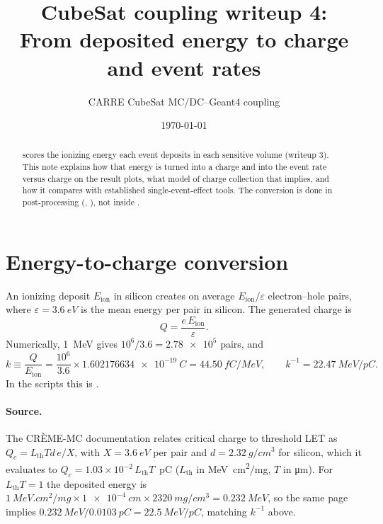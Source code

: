 

\title{CubeSat coupling writeup 4:\\From deposited energy to charge and event rates}
\author{CARRE CubeSat MC/DC--Geant4 coupling}
\date{\today}


\maketitle

\begin{abstract}
\gfour{} scores the ionizing energy each event deposits in each sensitive volume (writeup 3). This note explains how that energy is turned into a charge and into the event rate versus charge on the result plots, what model of charge collection that implies, and how it compares with established single-event-effect tools. The conversion is done in post-processing (, ), not inside \gfour{}.
\end{abstract}

\section{Energy-to-charge conversion}
An ionizing deposit $E_\text{ion}$ in silicon creates on average $E_\text{ion}/\varepsilon$ electron--hole pairs, where $\varepsilon=\SI{3.6}{eV}$ is the mean energy per pair in silicon. The generated charge is
\begin{equation}
  Q = \frac{e\,E_\text{ion}}{\varepsilon}.
\end{equation}
Numerically, \SI{1}{MeV} gives $10^6/3.6 = \num{2.78e5}$ pairs, and
\begin{equation}
  k \equiv \frac{Q}{E_\text{ion}} = \frac{10^6}{3.6}\times\SI{1.602176634e-19}{C}
  = \SI{44.50}{fC/MeV},\qquad k^{-1} = \SI{22.47}{MeV/pC}.
\end{equation}
In the scripts this is .

\paragraph{Source.} The CR\`EME-MC documentation \citep{cremeQcrit} relates critical charge to threshold LET as $Q_c = L_\text{th}Td\,e/X$, with $X=\SI{3.6}{eV}$ per pair and $d=\SI{2.32}{g/cm^3}$ for silicon, which it evaluates to $Q_c = 1.03\times10^{-2}\,L_\text{th}T$~pC ($L_\text{th}$ in \si{MeV.cm^2/mg}, $T$ in \si{\micro m}). For $L_\text{th}T = 1$ the deposited energy is $\SI{1}{MeV.cm^2/mg}\times\SI{1e-4}{cm}\times\SI{2320}{mg/cm^3} = \SI{0.232}{MeV}$, so the same page implies $\SI{0.232}{MeV}/\SI{0.0103}{pC} = \SI{22.5}{MeV/pC}$, matching $k^{-1}$ above.

